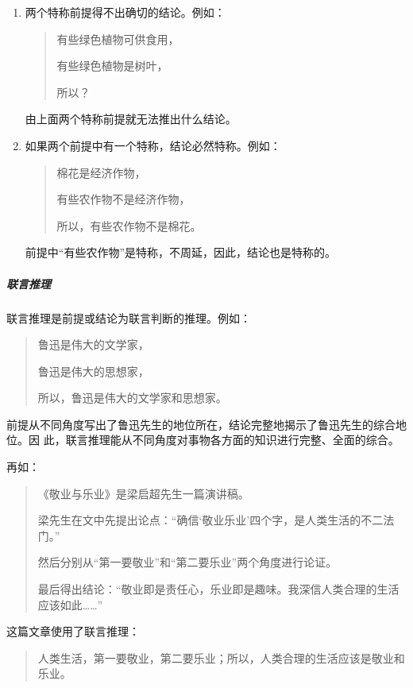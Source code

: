 \documentclass[final,oneside]{ctexbook}
\newenvironment{equotation}{\begin{quotation}\kaishu}{\end{quotation}}
\begin{document}
\begin{enumerate}
\begin{equotation}
      被告的行为是犯罪未遂，

      所以，被告的行为不是犯罪中止。
    \end{equotation}
    在两个前提中有一个是否定的情况下，只能推出一个否定的结论。

  \item 两个特称前提得不出确切的结论。例如：
    \begin{equotation}
      有些绿色植物可供食用，

      有些绿色植物是树叶，

      所以？
    \end{equotation}
    由上面两个特称前提就无法推出什么结论。

  \item 如果两个前提中有一个特称，结论必然特称。例如：
    \begin{equotation}
      棉花是经济作物，

      有些农作物不是经济作物，

      所以，有些农作物不是棉花。
    \end{equotation}
    前提中“有些农作物”是特称，不周延，因此，结论也是特称的。

\end{enumerate}

\subparagraph{联言推理} 联言推理是前提或结论为联言判断的推理。例如：
\begin{equotation}
  鲁迅是伟大的文学家，

  鲁迅是伟大的思想家，

  所以，鲁迅是伟大的文学家和思想家。
\end{equotation}
前提从不同角度写出了鲁迅先生的地位所在，结论完整地揭示了鲁迅先生的综合地位。因
此，联言推理能从不同角度对事物各方面的知识进行完整、全面的综合。

再如：
\begin{equotation}
  《敬业与乐业》是梁启超先生一篇演讲稿。

  梁先生在文中先提出论点：“确信‘敬业乐业’四个字，是人类生活的不二法门。”

  然后分别从“第一要敬业”和“第二要乐业”两个角度进行论证。

  最后得出结论：“敬业即是责任心，乐业即是趣味。我深信人类合理的生活应该如此……”
\end{equotation}
这篇文章使用了联言推理：

\begin{equotation}
  人类生活，第一要敬业，第二要乐业；所以，人类合理的生活应该是敬业和乐业。
\end{equotation}
\end{document}
